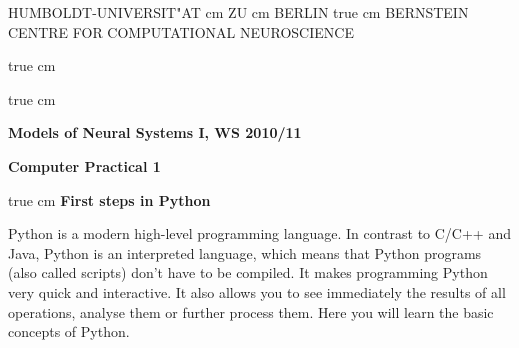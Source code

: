 \documentclass[12pt, a4]{article}
\begin{document}
\parbox{2cm}{
}
\parbox{11cm}{
\begin{center}
\large HUMBOLDT-UNIVERSIT"AT  cm ZU  cm BERLIN
 true cm
\mgross BERNSTEIN CENTRE FOR COMPUTATIONAL NEUROSCIENCE
\end{center}
}
\parbox{2cm}
{
\hfill
{}
}

 true cm





 true cm
\centerline{\bf Models of Neural Systems I, WS 2010/11}
\centerline{\bf Computer Practical 1}


 true cm
{\bf First steps in Python}

\medskip
Python is a modern high-level programming language. In contrast to
C/C++ and Java, Python is an interpreted language, which means that
Python programs (also called scripts) don't have to be compiled. It
makes programming Python very quick and interactive. It also allows
you to see immediately the results of all operations, analyse them or
further process them. Here you will learn the basic concepts of
Python.\\
\end{document}
